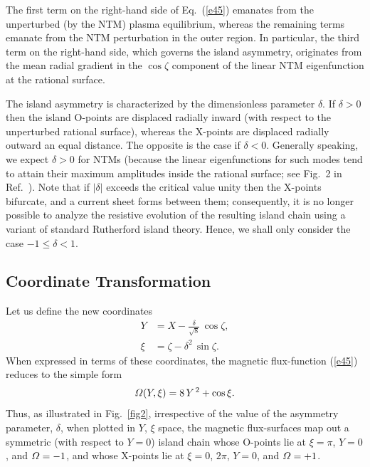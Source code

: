 \documentclass[12pt,prb,aps]{revtex4-1}
\begin{document}
The first term on the right-hand side of Eq.~(\ref{e45}) emanates from the unperturbed (by the NTM) plasma equilibrium, whereas the
remaining terms emanate from the NTM perturbation in the outer region. In particular, the third term on the right-hand
side, which governs the island asymmetry,  originates from  the mean radial gradient in the $\cos\zeta$ component of the linear NTM eigenfunction at the rational surface. 

The island asymmetry is characterized by the dimensionless parameter $\delta$. If $\delta >0$ then the island O-points are displaced radially inward (with respect to the unperturbed rational
surface), whereas the X-points are displaced radially outward an equal distance. The opposite is the case if $\delta <0$. Generally speaking,  we
expect $\delta>0$ for NTMs (because the linear eigenfunctions for such modes tend to attain their
maximum amplitudes inside the rational surface; see Fig.~2 in Ref.~). Note that if  $|\delta|$ exceeds the critical value
unity then the X-points bifurcate, and a current sheet forms between them;\cite{wal} consequently,  it is no longer possible to analyze the resistive evolution of the  resulting island chain  using a variant of standard Rutherford island theory.\cite{ntm1} Hence, we shall only consider the case $-1\leq \delta < 1$. 

\subsection{Coordinate Transformation}
Let us define the new coordinates\,\cite{island}
\begin{align}
Y &= X-\frac{\delta}{\sqrt{8}}\,\cos\zeta,\label{ek}\\[0.5ex]
\xi&=\zeta-\delta^2\,\sin\zeta.\label{ekepler}
\end{align}
When expressed in terms of these coordinates, the magnetic flux-function (\ref{e45}) reduces to the simple
form
\begin{equation}\label{eeven}
{\mit\Omega}(Y,\xi) =8\,Y^{\,2}+\cos\xi.
\end{equation}
Thus, as illustrated in Fig.~\ref{fig2}, irrespective of the value of the asymmetry parameter, $\delta$, when
plotted in $Y$, $\xi$ space, the magnetic flux-surfaces map out a symmetric (with respect to $Y=0$) island
chain whose O-points lie at $\xi=\pi$, $Y=0$,
and ${\mit\Omega}=-1$, and whose X-points lie at $\xi=0$, $2\pi$, $Y=0$, and ${\mit\Omega}=+1$.  
\end{document}

